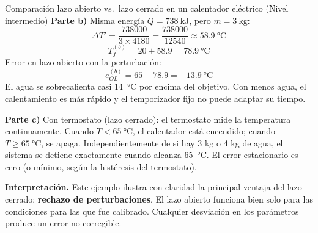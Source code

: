 \begin{ejercicioresuelto}{Comparación lazo abierto vs.\ lazo cerrado en un calentador eléctrico (Nivel intermedio)}
\textbf{Parte b)} Misma energía $Q = \SI{738}{\kilo\joule}$, pero $m = \SI{3}{\kilogram}$:
\begin{equation*}
  \Delta T' = \frac{738000}{3 \times 4180} = \frac{738000}{12540}
  \approx \SI{58.9}{\celsius}
\end{equation*}
\begin{equation*}
  T_f^{(b)} = 20 + 58.9 = \SI{78.9}{\celsius}
\end{equation*}
Error en lazo abierto con la perturbación:
\begin{equation*}
  e_{OL}^{(b)} = 65 - 78.9 = \SI{-13.9}{\celsius}
\end{equation*}
El agua se sobrecalienta casi \SI{14}{\celsius} por encima del objetivo.
Con menos agua, el calentamiento es más rápido y el temporizador fijo
no puede adaptar su tiempo.

\textbf{Parte c)} Con termostato (lazo cerrado): el termostato mide la
temperatura continuamente. Cuando $T < \SI{65}{\celsius}$, el calentador
está encendido; cuando $T \geq \SI{65}{\celsius}$, se apaga.
Independientemente de si hay 3 kg o 4 kg de agua, el sistema se detiene
exactamente cuando alcanza \SI{65}{\celsius}. El error estacionario es cero
(o mínimo, según la histéresis del termostato).

\textbf{Interpretación.} Este ejemplo ilustra con claridad la principal
ventaja del lazo cerrado: \textbf{rechazo de perturbaciones}. El lazo abierto
funciona bien solo para las condiciones para las que fue calibrado. Cualquier
desviación en los parámetros produce un error no corregible.
\end{ejercicioresuelto}

